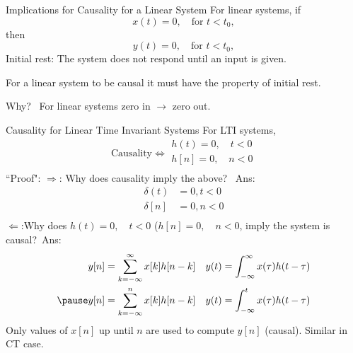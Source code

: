 \begin{frame}{Implications for Causality for a Linear System}
    For linear systems, if
    {
    \begin{equation*}
        x(t) =0, \quad \text{for } t < t_0,
    \end{equation*}
    then
    \begin{equation*}
        y(t) =0, \quad \text{for } t < t_0,
    \end{equation*}
    }
    {
        \vspace{1.5in}
    }
    Initial rest: The system does not respond until an input is given.\par For a linear system to be causal it must have the property of initial rest.\par
    Why?\pause~ For linear systems zero in $\rightarrow$ zero out.  \par

\end{frame}

\begin{frame}{Causality for Linear Time Invariant Systems}    For LTI systems,
    \begin{equation*}
        \text{Causality} \Leftrightarrow \begin{split}h(t) = 0, \quad  t <0\\  h[n] = 0, \quad  n <0\\      \end{split}
    \end{equation*}
    ``Proof":
    $\Rightarrow$:  Why does causality imply the above? \pause~Ans:
    {
    \begin{align*}
      \delta(t) &=  0, t<0\\
      \delta[n] &=  0, n<0\\
    \end{align*}
    }
    {
        \vspace{.5in}
    }
    \pause
    $\Leftarrow$:Why does $h(t) = 0, \quad  t <0$ ($h[n] = 0, \quad  n <0$, imply the system is causal?\pause~Ans:
    {
    \begin{equation*}
        \begin{split}
            y[n] = \sum_{k=-\infty}^{\infty}x[k]h[n-k] \quad & y(t) = \int_{-\infty}^{\infty}x(\tau)h(t-\tau)\\ \pause
            y[n] = \sum_{k=-\infty}^{n}x[k]h[n-k] \quad & y(t) = \int_{-\infty}^{t}x(\tau)h(t-\tau)
        \end{split}
    \end{equation*}
    Only values of $x[n]$ up until $n$ are used to compute  $y[n]$ (causal). Similar in CT case.
    }
\end{frame}

